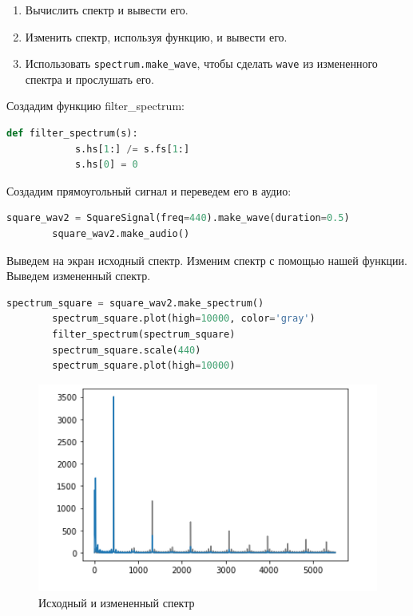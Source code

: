 \documentclass[a4paper, 14pt]{extarticle}
\begin{document}
    \begin{enumerate}
        \item Вычислить спектр и вывести его.
        \item Изменить спектр, используя функцию, и вывести его.
        \item Использовать \texttt{spectrum.make\_wave}, чтобы сделать \texttt{wave} из измененного спектра и прослушать его.
    \end{enumerate}

    Создадим функцию filter\_spectrum:

    \begin{lstlisting}[language=Python, caption= Функция filter\_spectrum, label={lst:filter_spectrum}]
        def filter_spectrum(s):
            s.hs[1:] /= s.fs[1:]
            s.hs[0] = 0
    \end{lstlisting}

    Создадим прямоугольный сигнал и переведем его в аудио:

    \begin{lstlisting}[language=Python, caption= Создание прямоугольного сигнала и создание аудио, label={lst:make_signal_audio}]
        square_wav2 = SquareSignal(freq=440).make_wave(duration=0.5)
        square_wav2.make_audio()
    \end{lstlisting}

    Выведем на экран исходный спектр.
    Изменим спектр с помощью нашей функции.
    Выведем измененный спектр.

    \begin{lstlisting}[language=Python, caption= Изменение и вывод спектров на экран, label={lst:change_spectr_with_func}]
        spectrum_square = square_wav2.make_spectrum()
        spectrum_square.plot(high=10000, color='gray')
        filter_spectrum(spectrum_square)
        spectrum_square.scale(440)
        spectrum_square.plot(high=10000)
    \end{lstlisting}

    \begin{figure}[H]
        \centering
        \includegraphics[width=\textwidth]{square_filtered_spectrum}
        \caption{Исходный и измененный спектр}
        \label{fig:square_filtered_spectrum}
    \end{figure}
\end{document}
